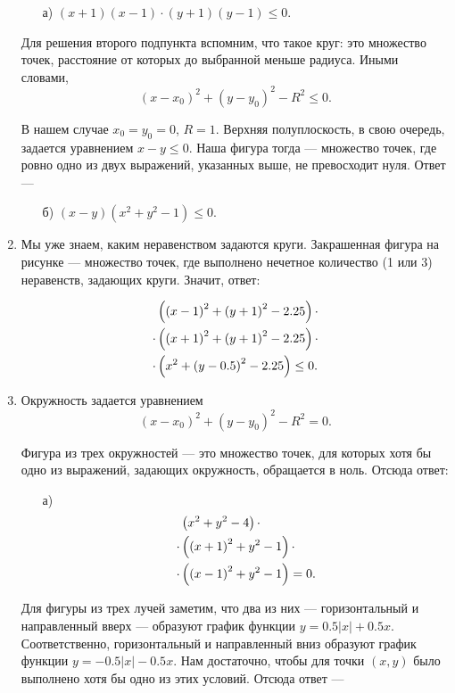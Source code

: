 \begin{enumerate}
\begin{enumerate}
	\item[а)] $(x+1)(x-1) \cdot (y+1)(y-1) \le 0$.
\end{enumerate}

Для решения второго подпункта вспомним, что такое круг: это множество точек, расстояние от которых до выбранной меньше радиуса. Иными словами,
$$(x-x_0)^2+(y-y_0)^2 - R^2 \le 0.$$

В нашем случае $x_0 = y_0 = 0$, $R=1$. Верхняя полуплоскость, в свою очередь, задается уравнением $x-y \le 0$. Наша фигура тогда — множество точек, где ровно одно из двух выражений, указанных выше, не превосходит нуля. Ответ —

\begin{enumerate}
	\item[б)] $(x-y)(x^2 + y^2 -1) \le 0.$
\end{enumerate}

\item Мы уже знаем, каким неравенством задаются круги. Закрашенная фигура на рисунке — множество точек, где выполнено нечетное количество (1 или 3) неравенств, задающих круги. Значит, ответ:

\begin{align*}
	& \left( \left( x-1 \right) ^2 + \left( y+1 \right) ^2 - 2.25 \right) \cdot \\
	\cdot & \left( \left( x+1 \right) ^2 + \left( y+1 \right) ^2 - 2.25 \right) \cdot \\
	\cdot & \left( x^2 + \left( y-0.5 \right) ^2 - 2.25 \right) \le 0.
\end{align*}

\item Окружность задается уравнением
$$(x-x_0)^2+(y-y_0)^2 - R^2 = 0.$$

Фигура из трех окружностей — это множество точек, для которых хотя бы одно из выражений, задающих окружность, обращается в ноль. Отсюда ответ:

\begin{enumerate}
	\item[а)]
	\begin{align*}
		& \left( x^2 + y^2 - 4 \right) \cdot \\
		\cdot & \left( \left( x+1 \right) ^2 + y^2 - 1 \right) \cdot \\
		\cdot & \left( \left( x-1 \right) ^2 + y^2 - 1 \right) = 0.
	\end{align*}
\end{enumerate}

\vspace{-0.4cm}
Для фигуры из трех лучей заметим, что два из них — горизонтальный и направленный вверх — образуют график функции $y = 0.5 |x| + 0.5x$. Соответственно, горизонтальный и направленный вниз образуют график функции $y = -0.5 |x| - 0.5x$. Нам достаточно, чтобы для точки $(x,y)$ было выполнено хотя бы одно из этих условий. Отсюда ответ —


\end{enumerate}
